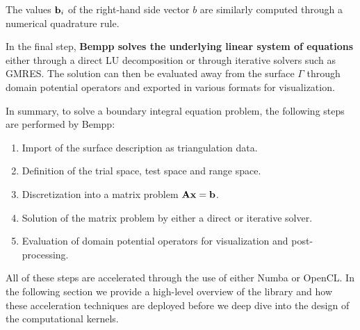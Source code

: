 The values $\mathbf{b}_i$ of the right-hand side vector $b$ are similarly computed through a numerical quadrature rule.

In the final step, \textbf{Bempp solves the underlying linear system of equations} either through a direct LU decomposition or through iterative solvers such as GMRES. The solution can then be evaluated away from the surface $\Gamma$ through domain potential operators and exported in various formats for visualization.

In summary, to solve a boundary integral equation problem, the following steps are performed by Bempp:
\begin{enumerate}
	\item Import of the surface description as triangulation data.
	\item Definition of the trial space, test space and range space.
	\item Discretization into a matrix problem $\mathbf{A}\mathbf{x}=\mathbf{b}$.
	\item Solution of the matrix problem by either a direct or iterative solver.
	\item Evaluation of domain potential operators for visualization and post-processing.
\end{enumerate}

All of these steps are accelerated through the use of either Numba or OpenCL. In the following section we provide a high-level overview of the library and how these acceleration techniques are deployed before we deep dive into the design of the computational kernels.
